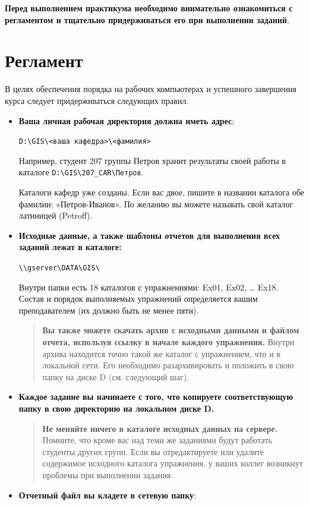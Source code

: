 \documentclass[12pt,]{book}
\begin{document}
\textbf{Перед выполнением практикума необходимо внимательно ознакомиться с регламентом и тщательно придерживаться его при выполнении заданий}.

\hypertarget{section-1}{%
\section*{Регламент}\label{section-1}}

В целях обеспечения порядка на рабочих компьютерах и успешного завершения курса следует придерживаться следующих правил.

\begin{itemize}
\item
  \textbf{Ваша личная рабочая директория должна иметь адрес}:

  \texttt{D:\textbackslash{}GIS\textbackslash{}\textless{}ваша\ кафедра\textgreater{}\textbackslash{}\textless{}фамилия\textgreater{}}

  Например, студент 207 группы Петров хранит результаты своей работы в каталоге \texttt{D:\textbackslash{}GIS\textbackslash{}207\_CAR\textbackslash{}Петров}.

  Каталоги кафедр уже созданы. Если вас двое, пишите в названии каталога обе фамилии: «Петров-Иванов». По желанию вы можете называть свой каталог латиницей (Petroff).
\item
  \textbf{Исходные данные, а также шаблоны отчетов для выполнения всех заданий лежат в каталоге:}

  \texttt{\textbackslash{}\textbackslash{}gserver\textbackslash{}DATA\textbackslash{}GIS\textbackslash{}}

  Внутри папки есть 18 каталогов с упражнениями: Ex01, Ex02, \ldots{} Ex18. Состав и порядок выполняемых упражнений определяется вашим преподавателем (их должно быть не менее пяти).

  \begin{quote}
  \textbf{Вы также можете скачать архив с исходными данными и файлом отчета, используя ссылку в начале каждого упражнения.} Внутри архива находится точно такой же каталог с упражнением, что и в локальной сети. Его необходимо разархивировать и положить в свою папку на диске D (см. следующий шаг).
  \end{quote}
\item
  \textbf{Каждое задание вы начинаете с того, что копируете соответствующую папку в свою директорию на локальном диске D.}

  \begin{quote}
  \textbf{Не меняйте ничего в каталоге исходных данных на сервере.} Помните, что кроме вас над теми же заданиями будут работать студенты других групп. Если вы отредактируете или удалите содержимое исходного каталога упражнения, у ваших коллег возникнут проблемы при выполнении задания.
  \end{quote}
\item
  \textbf{Отчетный файл вы кладете в сетевую папку}:


\end{itemize}
\end{document}
